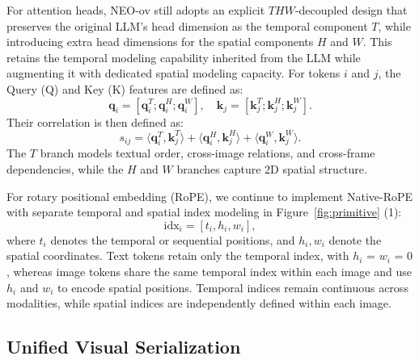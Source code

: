 \documentclass{llmxive}
\begin{document}
For attention heads, NEO-ov still adopts an explicit $THW$-decoupled design that preserves the original LLM's head dimension as the temporal component $T$, while introducing extra head dimensions for the spatial components $H$ and $W$. This retains the temporal modeling capability inherited from the LLM while augmenting it with dedicated spatial modeling capacity. For tokens $i$ and $j$, the Query (Q) and Key (K) features are defined as:
\begin{equation}
\mathbf{q}_i=[\mathbf{q}_i^T;\mathbf{q}_i^H;\mathbf{q}_i^W],\quad
\mathbf{k}_j=[\mathbf{k}_j^T;\mathbf{k}_j^H;\mathbf{k}_j^W].
\end{equation}
Their correlation is then defined as:
\begin{equation}
s_{ij}
=
\langle \mathbf{q}_i^T,\mathbf{k}_j^T\rangle
+
\langle \mathbf{q}_i^H,\mathbf{k}_j^H\rangle
+
\langle \mathbf{q}_i^W,\mathbf{k}_j^W\rangle.
\end{equation}
The $T$ branch models textual order, cross-image relations, and cross-frame dependencies, while the $H$ and $W$ branches capture 2D spatial structure. 


For rotary positional embedding (RoPE), we continue to implement Native-RoPE with separate temporal and spatial index modeling in Figure~\ref{fig:primitive} (1):
\begin{equation}
\mathrm{idx}_i = [t_i, h_i, w_i],
\end{equation}
where $t_i$ denotes the temporal or sequential positions, and $h_i, w_i$ denote the spatial coordinates. 
%
Text tokens retain only the temporal index, with $h_i$ = $w_i$ = $0$, whereas image tokens share the same temporal index within each image and use $h_i$ and $w_i$ to encode spatial positions. Temporal indices remain continuous across modalities, while spatial indices are independently defined within each image.

\subsection{Unified Visual Serialization}
\end{document}
